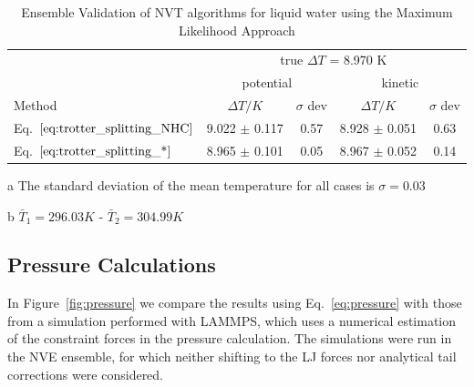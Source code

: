\documentclass[aip,jcp,reprint,amsmath,amssymb,amsfont]{revtex4-1}
\begin{document}
\begingroup
\squeezetable
\begin{table}
\setlength{\tabcolsep}{7pt}
\begin{threeparttable}
\caption{Ensemble Validation of NVT algorithms for liquid water using the Maximum Likelihood Approach  }
\label{table:ensemblevalidation}
\centering %
\begin{tabular}{|l c  c  c  c |}  
\hline
 & \multicolumn{4}{c|}{true $\Delta T$ = 8.970 K}\\
\cline{2-5}
  & \multicolumn{2}{c}{potential} & \multicolumn{2}{c|}{kinetic}\\
\hline
Method  &$\Delta T/K$ &$\sigma$ dev &$\Delta T/K$&$\sigma$ dev\\
\hline %
 Eq.~$\ref{eq:trotter_splitting_NHC}$   & 9.022 $\pm$ 0.117 & 0.57 & 8.928 $\pm$ 0.051 & 0.63 \\
 Eq.~$\ref{eq:trotter_splitting_*}$   & 8.965 $\pm$ 0.101 & 0.05 & 8.967 $\pm$ 0.052 & 0.14\\
  \hline
\end{tabular}
\begin{tablenotes}
\item[a] The standard deviation of the mean temperature for all cases is $\sigma = 0.03$
\item[b]$\bar{T}_1 = 296.03 K $  - $\bar{T}_2 = 304.99 K$
\end{tablenotes}
\end{threeparttable}
\end{table}
\endgroup

\subsection{Pressure Calculations}

In Figure~\ref{fig:pressure} we compare the results using Eq.~\ref{eq:pressure} with those from a simulation performed with LAMMPS, which uses a numerical estimation of the constraint forces in the pressure calculation. The simulations were run in the NVE ensemble, for which neither shifting to the LJ forces nor analytical tail corrections were considered. 

\end{document}
